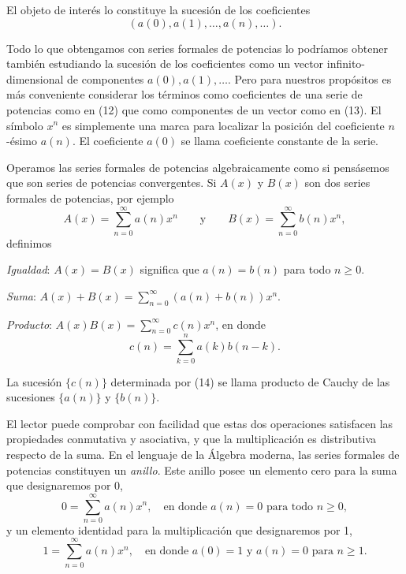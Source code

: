 \documentclass[12pt,a4paper]{book}
\begin{document}
    El objeto de interés lo constituye la sucesión de los coeficientes
    \begin{equation}
        (a(0),a(1),\dots,a(n),\dots).
    \end{equation}

    Todo lo que obtengamos con series formales de potencias lo podríamos obtener también
    estudiando la sucesión de los coeficientes como un vector infinito-dimensional de
    componentes $a(0),a(1),\dots$. Pero para nuestros propósitos es más conveniente
    considerar los términos como coeficientes de una serie de potencias como en (12) que
    como componentes de un vector como en (13). El símbolo $x^{n}$ es simplemente una marca
    para localizar la posición del coeficiente $n$-ésimo $a(n)$. El coeficiente $a(0)$ se
    llama coeficiente constante de la serie.

    Operamos las series formales de potencias algebraicamente como si pensásemos que son
    series de potencias convergentes. Si $A(x)$ y $B(x)$ son dos series formales de
    potencias, por ejemplo
    \begin{equation*}
        A(x)=\sum_{n=0}^{\infty}a(n)x^{n}\qquad\text{y}\qquad B(x)=\sum_{n=0}^{\infty}b(n)x^{n},
    \end{equation*}
    definimos

    \textit{Igualdad}: $A(x)=B(x)$ significa que $a(n)=b(n)$ para todo $n\geq0$.

    \textit{Suma}: $A(x)+B(x)=\sum_{n=0}^{\infty}(a(n)+b(n))x^{n}$.

    \textit{Producto}: $A(x)B(x)=\sum_{n=0}^{\infty}c(n)x^{n}$, en donde
    \begin{equation}
        c(n)=\sum_{k=0}^{n}a(k)b(n-k).
    \end{equation}

    La sucesión $\{c(n)\}$ determinada por (14) se llama producto de Cauchy de las
    sucesiones $\{a(n)\}$ y $\{b(n)\}$.

    El lector puede comprobar con facilidad que estas dos operaciones satisfacen las
    propiedades conmutativa y asociativa, y que la multiplicación es distributiva respecto
    de la suma. En el lenguaje de la Álgebra moderna, las series formales de potencias
    constituyen un \textit{anillo}. Este anillo posee un elemento cero para la suma que
    designaremos por 0,
    \begin{equation*}
        0=\sum_{n=0}^{\infty}a(n)x^{n},\quad\text{en donde } a(n)=0 \text{ para todo } n\geq0,
    \end{equation*}
    y un elemento identidad para la multiplicación que designaremos por 1,
    \begin{equation*}
        1=\sum_{n=0}^{\infty}a(n)x^{n},\quad\text{en donde } a(0)=1 \text{ y } a(n)=0
        \text{ para } n\geq1.
    \end{equation*}
\end{document}
